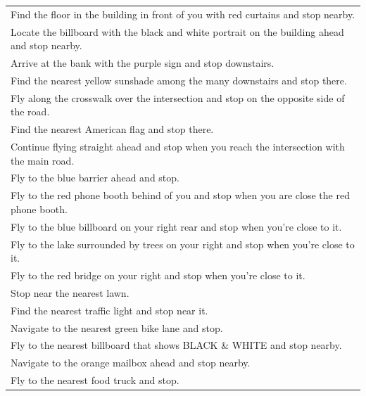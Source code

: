 \documentclass[11pt]{article}
\begin{document}
\begin{table}[htbp]
{\begin{tabular}{>{\centering\arraybackslash}p{\textwidth}}
Find the floor in the building in front of you with red curtains and stop nearby. \\
Locate the billboard with the black and white portrait on the building ahead and stop nearby. \\
Arrive at the bank with the purple sign and stop downstairs. \\
Find the nearest yellow sunshade among the many downstairs and stop there. \\
Fly along the crosswalk over the intersection and stop on the opposite side of the road. \\
Find the nearest American flag and stop there. \\
Continue flying straight ahead and stop when you reach the intersection with the main road. \\
Fly to the blue barrier ahead and stop. \\
Fly to the red phone booth behind of you and stop when you are close the red phone booth. \\
Fly to the blue billboard on your right rear and stop when you’re close to it. \\
Fly to the lake surrounded by trees on your right and stop when you’re close to it. \\
Fly to the red bridge on your right and stop when you’re close to it. \\
Stop near the nearest lawn. \\
Find the nearest traffic light and stop near it. \\
Navigate to the nearest green bike lane and stop. \\
Fly to the nearest billboard that shows BLACK \& WHITE and stop nearby. \\
Navigate to the orange mailbox ahead and stop nearby. \\
Fly to the nearest food truck and stop. \\
\hline
\end{tabular}
}
\end{table}
\end{document}
